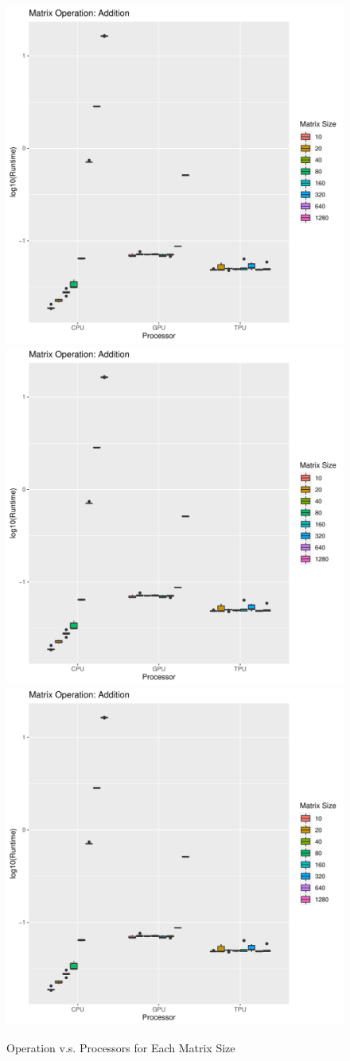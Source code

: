 \documentclass[
]{article}
\begin{document}
\begin{figure}
\includegraphics[page=1,width=0.5\linewidth]{../figs/operations_plots.pdf}
\includegraphics[page=2,width=0.5\linewidth]{../figs/operations_plots.pdf}
\includegraphics[page=3,width=0.5\linewidth]{../figs/operations_plots.pdf}
\caption{\label{fig:operation} Operation v.s. Processors for Each Matrix Size}
\end{figure}
\end{document}
